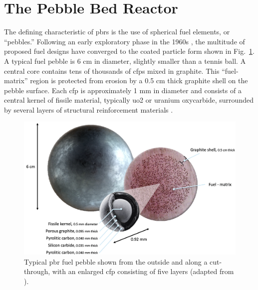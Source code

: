 \section{The Pebble Bed Reactor}
\label{sec:pbr_concept}


The defining characteristic of \glspl{pbr} is the use of spherical fuel elements, or ``pebbles.'' Following an early exploratory phase in the 1960s \cite{claxton,hecker}, the multitude of proposed fuel designs have converged to the coated particle form shown in Fig.\ \ref{fig:pbr_fuel}. A typical fuel pebble is 6 \si{\centi\meter} in diameter, slightly smaller than a tennis ball. A central core contains tens of thousands of \glspl{cfp} mixed in graphite. This ``fuel-matrix'' region is protected from erosion by a 0.5 \si{\centi\meter} thick graphite shell on the pebble surface. Each \gls{cfp} is approximately 1 \si{\milli\meter} in diameter and consists of a central kernel of fissile material, typically \gls{uo2} or uranium oxycarbide, surrounded by several layers of structural reinforcement materials \cite{demkowicz, powers}.

\begin{figure}[!h]
\centering
\includegraphics[width=0.6\linewidth]{figs/pbr_fuel.png}
\caption{Typical \gls{pbr} fuel pebble shown from the outside and along a cut-through, with an enlarged \gls{cfp} consisting of five layers (adapted from \cite{x_energy_pebble}).}
\label{fig:pbr_fuel}
\end{figure}

